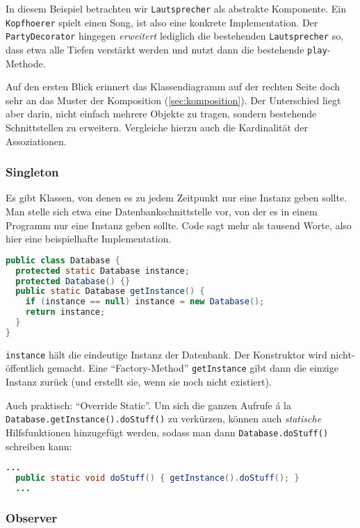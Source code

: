 \documentclass{panikzettel}
\begin{document}
In diesem Beispiel betrachten wir \lstinline{Lautsprecher} als abstrakte Komponente. Ein \lstinline{Kopfhoerer} spielt einen Song, ist also eine konkrete Implementation. Der \lstinline{PartyDecorator} hingegen \emph{erweitert} lediglich die bestehenden \lstinline{Lautsprecher} so, dass etwa alle Tiefen verstärkt werden und nutzt dann die bestehende \lstinline{play}-Methode.

Auf den ersten Blick erinnert das Klassendiagramm auf der rechten Seite doch sehr an das Muster der Komposition (\ref{sec:komposition}). Der Unterschied liegt aber darin, nicht einfach mehrere Objekte zu tragen, sondern bestehende Schnittstellen zu erweitern. Vergleiche hierzu auch die Kardinalität der Assoziationen.

\subsubsection{Singleton}

Es gibt Klassen, von denen es zu jedem Zeitpunkt nur eine Instanz geben sollte. Man stelle sich etwa eine Datenbankschnittstelle vor, von der es in einem Programm nur eine Instanz geben sollte. Code sagt mehr als tausend Worte, also hier eine beispielhafte Implementation.

\begin{lstlisting}[language=Java]
public class Database {
  protected static Database instance;
  protected Database() {}
  public static Database getInstance() {
    if (instance == null) instance = new Database();
    return instance;
  }
}
\end{lstlisting}

\lstinline{instance} hält die eindeutige Instanz der Datenbank. Der Konstruktor wird nicht-öffentlich gemacht. Eine ``Factory-Method'' \lstinline{getInstance} gibt dann die einzige Instanz zurück (und erstellt sie, wenn sie noch nicht existiert).

Auch praktisch: ``Override Static''. Um sich die ganzen Aufrufe á la \lstinline{Database.getInstance().doStuff()} zu verkürzen, können auch \emph{statische} Hilfsfunktionen hinzugefügt werden, sodass man dann \lstinline{Database.doStuff()} schreiben kann:

\begin{lstlisting}[language=Java]
  ...
  public static void doStuff() { getInstance().doStuff(); }
  ...
\end{lstlisting}

\subsubsection{Observer}
\end{document}
